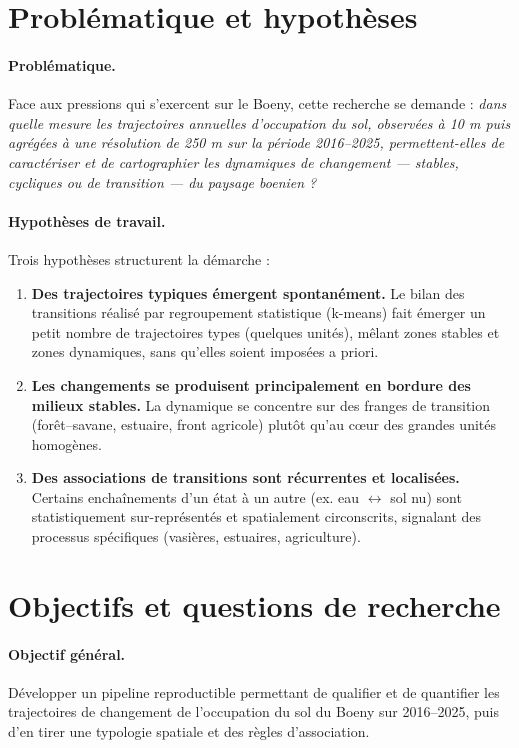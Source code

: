 \section{Problématique et hypothèses}

\paragraph{Problématique.} Face aux pressions qui s'exercent sur le Boeny, cette
recherche se demande : \emph{dans quelle mesure les trajectoires annuelles
d'occupation du sol, observées à 10 m puis agrégées à une résolution de 250 m sur
la période 2016--2025, permettent-elles de caractériser et de cartographier les
dynamiques de changement — stables, cycliques ou de transition — du paysage
boenien ?}

\paragraph{Hypothèses de travail.} Trois hypothèses structurent la démarche :

\begin{enumerate}
  \item \textbf{Des trajectoires typiques émergent spontanément.} Le bilan des
        transitions réalisé par regroupement statistique (k-means) fait émerger
        un petit nombre de trajectoires types (quelques unités), mêlant zones
        stables et zones dynamiques, sans qu'elles soient imposées a priori.
  \item \textbf{Les changements se produisent principalement en bordure des
        milieux stables.} La dynamique se concentre sur des franges de
        transition (forêt--savane, estuaire, front agricole) plutôt qu'au cœur
        des grandes unités homogènes.
  \item \textbf{Des associations de transitions sont récurrentes et localisées.}
        Certains enchaînements d'un état à un autre (ex. eau $\leftrightarrow$
        sol nu) sont statistiquement sur-représentés et spatialement circonscrits,
        signalant des processus spécifiques (vasières, estuaires, agriculture).
\end{enumerate}

\section{Objectifs et questions de recherche}

\paragraph{Objectif général.} Développer un pipeline reproductible permettant de
qualifier et de quantifier les trajectoires de changement de l'occupation du sol
du Boeny sur 2016--2025, puis d'en tirer une typologie spatiale et des règles
d'association.

